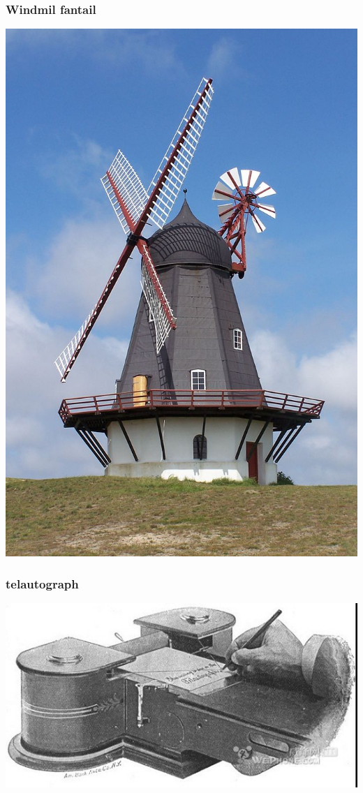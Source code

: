 \documentclass{article}
\begin{document}
\begin{frame}
\frametitle{Windmil fantail}
\label{sec-1-1-5}

\includegraphics[height=\textheight]{image/DK_Fanoe_Windmill01.JPG}
\end{frame}
\begin{frame}
\frametitle{telautograph}
\label{sec-1-1-6}

\includegraphics[width=\textwidth]{image/telautograph.jpg}
\end{frame}
\end{document}
